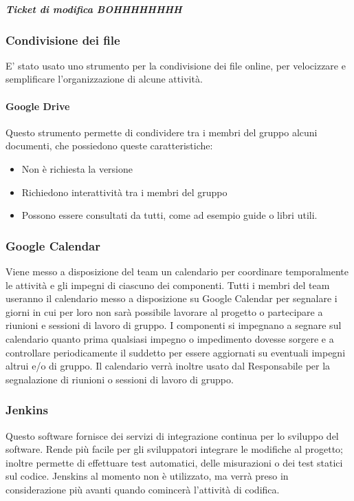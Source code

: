 \subparagraph{Ticket di modifica BOHHHHHHHH}

\subsubsection{Condivisione dei file}
E' stato usato uno strumento per la condivisione dei file online, per velocizzare e semplificare l'organizzazione di alcune attività.

\paragraph{Google Drive \\}
Questo strumento permette di condividere tra i membri del gruppo alcuni documenti, che possiedono queste caratteristiche:
\begin{itemize}
\item Non è richiesta la versione
\item Richiedono interattività tra i membri del gruppo
\item Possono essere consultati da tutti, come ad esempio guide o libri utili.
\end{itemize}

\subsubsection{Google Calendar}
\label{4.2}
Viene messo a disposizione del team un calendario per coordinare temporalmente le attività e gli impegni di ciascuno dei componenti.
Tutti i membri del team useranno il calendario messo a disposizione su Google Calendar per segnalare i giorni in cui per loro non sarà possibile lavorare al progetto o partecipare a riunioni e sessioni di lavoro di gruppo. I componenti si impegnano a segnare sul calendario quanto prima qualsiasi impegno o impedimento dovesse sorgere e a controllare periodicamente il suddetto per essere aggiornati su eventuali impegni altrui e/o di gruppo.
Il calendario verrà inoltre usato dal Responsabile per la segnalazione di riunioni o sessioni di lavoro di gruppo.

\subsubsection{Jenkins}
\label{}
Questo software fornisce dei servizi di integrazione continua per lo sviluppo del software. Rende più facile per gli sviluppatori integrare le modifiche al progetto; inoltre permette di effettuare test automatici, delle misurazioni o dei test statici sul codice. Jenskins al momento non è utilizzato, ma verrà preso in considerazione più avanti quando comincerà l'attività di codifica.



